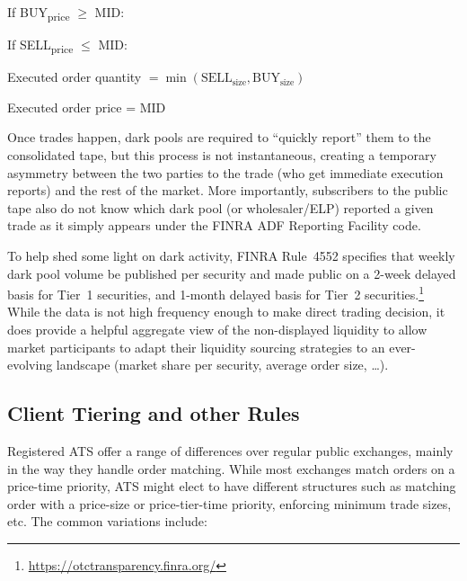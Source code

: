 \noindent If BUY\textsubscript{price} $\geq$ MID: \par
\indent If SELL\textsubscript{price} $\leq$ MID: \par
\indent\indent Executed order quantity $= \min(\text{SELL}_{\text{size}}, \text{BUY}_{\text{size}})$ \par
\indent\indent Executed order price = MID \twomedskip


Once trades happen, dark pools are required to ``quickly report'' them to the consolidated tape, but this process is not instantaneous, creating a temporary asymmetry between the two parties to the trade (who get immediate execution reports) and the rest of the market. More importantly, subscribers to the public tape also do not know which dark pool (or wholesaler/ELP) reported a given trade as it simply appears under the FINRA ADF Reporting Facility code.


To help shed some light on dark activity, FINRA Rule~4552 specifies that weekly dark pool volume be published per security and made public on a 2-week delayed basis for Tier~1 securities, and 1-month delayed basis for Tier~2 securities.\footnote{\url{https://otctransparency.finra.org/}} While the data is not high frequency enough to make direct trading decision, it does provide a helpful aggregate view of the non-displayed liquidity to allow market participants to adapt their liquidity sourcing strategies to an ever-evolving landscape (market share per security, average order size, \dots).


\subsection{Client Tiering and other Rules}

Registered ATS offer a range of differences over regular public exchanges, mainly in the way they handle order matching. While most exchanges match orders on a price-time priority, ATS might elect to have different structures such as matching order with a price-size or price-tier-time priority, enforcing minimum trade sizes, etc. The common variations include:



